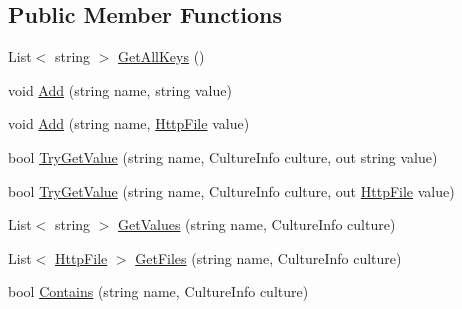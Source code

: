 \subsection*{Public Member Functions}
\begin{DoxyCompactItemize}
\item 
List$<$ string $>$ \hyperlink{classCqrs_1_1WebApi_1_1Formatters_1_1FormMultipart_1_1Infrastructure_1_1FormData_a0fe5f9fb07740a743348badb244980a4_a0fe5f9fb07740a743348badb244980a4}{Get\+All\+Keys} ()
\item 
void \hyperlink{classCqrs_1_1WebApi_1_1Formatters_1_1FormMultipart_1_1Infrastructure_1_1FormData_a901e35133be31392947951d78632e593_a901e35133be31392947951d78632e593}{Add} (string name, string value)
\item 
void \hyperlink{classCqrs_1_1WebApi_1_1Formatters_1_1FormMultipart_1_1Infrastructure_1_1FormData_a11d2a07d1ba691b35ee3b3e553c040ba_a11d2a07d1ba691b35ee3b3e553c040ba}{Add} (string name, \hyperlink{classCqrs_1_1WebApi_1_1Formatters_1_1FormMultipart_1_1Infrastructure_1_1HttpFile}{Http\+File} value)
\item 
bool \hyperlink{classCqrs_1_1WebApi_1_1Formatters_1_1FormMultipart_1_1Infrastructure_1_1FormData_ac4a6a0575ca53bd9fdd35537e0421575_ac4a6a0575ca53bd9fdd35537e0421575}{Try\+Get\+Value} (string name, Culture\+Info culture, out string value)
\item 
bool \hyperlink{classCqrs_1_1WebApi_1_1Formatters_1_1FormMultipart_1_1Infrastructure_1_1FormData_a0e75225cc7dc6292c4288924bcb23f62_a0e75225cc7dc6292c4288924bcb23f62}{Try\+Get\+Value} (string name, Culture\+Info culture, out \hyperlink{classCqrs_1_1WebApi_1_1Formatters_1_1FormMultipart_1_1Infrastructure_1_1HttpFile}{Http\+File} value)
\item 
List$<$ string $>$ \hyperlink{classCqrs_1_1WebApi_1_1Formatters_1_1FormMultipart_1_1Infrastructure_1_1FormData_afee05e0f8f3d7752bd8feb168e68428b_afee05e0f8f3d7752bd8feb168e68428b}{Get\+Values} (string name, Culture\+Info culture)
\item 
List$<$ \hyperlink{classCqrs_1_1WebApi_1_1Formatters_1_1FormMultipart_1_1Infrastructure_1_1HttpFile}{Http\+File} $>$ \hyperlink{classCqrs_1_1WebApi_1_1Formatters_1_1FormMultipart_1_1Infrastructure_1_1FormData_af38e78af3402d92c6bb4c85ebe60fc55_af38e78af3402d92c6bb4c85ebe60fc55}{Get\+Files} (string name, Culture\+Info culture)
\item 
bool \hyperlink{classCqrs_1_1WebApi_1_1Formatters_1_1FormMultipart_1_1Infrastructure_1_1FormData_ae43d8a31fa56a669756b97724bf0703b_ae43d8a31fa56a669756b97724bf0703b}{Contains} (string name, Culture\+Info culture)
\end{DoxyCompactItemize}

